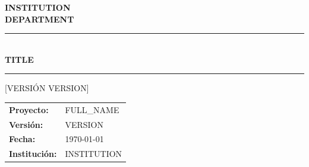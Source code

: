\documentclass[12pt, a4paper, oneside]{article}
\begin{document}
\begin{titlepage}
  \centering
  \vspace*{1.5cm}

  {\Large\textbf{{{INSTITUTION}}}}\\[0.3cm]
  {\large\textbf{{{DEPARTMENT}}}}\\[0.3cm]

  \vspace{1.5cm}
  \noindent\rule{\textwidth}{2pt}\\[0.3cm]

  {\LARGE\bfseries{}
    {{TITLE}}
  }\\[0.3cm]
  \noindent\rule{\textwidth}{0.5pt}

  \vspace{1cm}
  {\large [VERSIÓN {{VERSION}}]}

  \vfill

  \begin{tabular}{ll}
    \textbf{Proyecto:}    & {{FULL_NAME}} \\
    \textbf{Versión:}     & {{VERSION}} \\
    \textbf{Fecha:}       & \today \\
    \textbf{Institución:} & {{INSTITUTION}} \\
  \end{tabular}

  \vspace{1.5cm}
\end{titlepage}

\newpage
\tableofcontents
\newpage

% 
\end{document}
